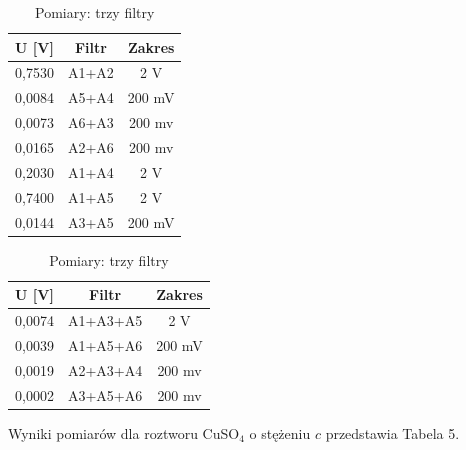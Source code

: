 \documentclass[10pt,a4paper]{article}
\begin{document}
\begin{table}[h!]

\setlength\tabcolsep{4 pt}
\begin{minipage}{0.5\textwidth}
\centering
\caption{Pomiary: dwa filtry}
\begin{tabular}{|c|c|c|}
\hline
U [V]  & Filtr & Zakres \\ \hline
0,7530 & A1+A2 & 2 V    \\ \hline
0,0084 & A5+A4 & 200 mV \\ \hline
0,0073 & A6+A3 & 200 mv \\ \hline
0,0165 & A2+A6 & 200 mv \\ \hline
0,2030 & A1+A4 & 2 V    \\ \hline
0,7400 & A1+A5 & 2 V    \\ \hline
0,0144 & A3+A5 & 200 mV \\ \hline
\end{tabular}


\end{minipage}
\hfill
\begin{minipage}{0.5\textwidth}
\centering
\caption{Pomiary: trzy filtry}
\begin{tabular}{|c|c|c|}
\hline
U [V]  & Filtr    & Zakres \\ \hline
0,0074 & A1+A3+A5 & 2 V    \\ \hline
0,0039 & A1+A5+A6 & 200 mV \\ \hline
0,0019 & A2+A3+A4 & 200 mv \\ \hline
0,0002 & A3+A5+A6 & 200 mv \\ \hline
\end{tabular}
\end{minipage}
\end{table}

Wyniki pomiarów dla roztworu CuSO$_{4}$ o stężeniu $c$ przedstawia Tabela 5.
\end{document}
